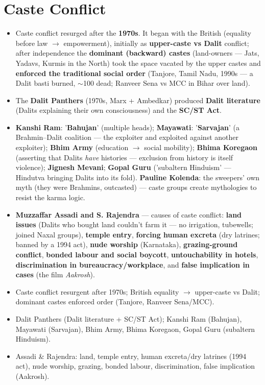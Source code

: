 \section{Caste Conflict}

\begin{KeyConcept}
\begin{itemize}
\item Caste conflict resurged after the \textbf{1970s}. It began with the British (equality before law $\rightarrow$ empowerment), initially as \textbf{upper-caste vs Dalit} conflict; after independence the \textbf{dominant (backward) castes} (land-owners --- Jats, Yadavs, Kurmis in the North) took the space vacated by the upper castes and \textbf{enforced the traditional social order} (Tanjore, Tamil Nadu, 1990s --- a Dalit basti burned, $\sim$100 dead; Ranveer Sena vs MCC in Bihar over land).
\item The \textbf{Dalit Panthers} (1970s, Marx + Ambedkar) produced \textbf{Dalit literature} (Dalits explaining their own consciousness) and the \textbf{SC/ST Act}.
\item \textbf{Kanshi Ram}: '\textbf{Bahujan}' (multiple heads); \textbf{Mayawati}: '\textbf{Sarvajan}' (a Brahmin--Dalit coalition --- the exploiter and exploited against another exploiter); \textbf{Bhim Army} (education $\rightarrow$ social mobility); \textbf{Bhima Koregaon} (asserting that Dalits \emph{have} histories --- exclusion from history is itself violence); \textbf{Jignesh Mevani}; \textbf{Gopal Guru} ('subaltern Hinduism' --- Hindutva bringing Dalits into its fold). \textbf{Pauline Kolenda}: the sweepers' own myth (they were Brahmins, outcasted) --- caste groups create mythologies to resist the karma logic.
\item \textbf{Muzzaffar Assadi and S. Rajendra} --- causes of caste conflict: \textbf{land issues} (Dalits who bought land couldn't farm it --- no irrigation, tubewells; joined Naxal groups), \textbf{temple entry}, \textbf{forcing human excreta} (dry latrines; banned by a 1994 act), \textbf{nude worship} (Karnataka), \textbf{grazing-ground conflict}, \textbf{bonded labour and social boycott}, \textbf{untouchability in hotels}, \textbf{discrimination in bureaucracy/workplace}, and \textbf{false implication in cases} (the film \emph{Aakrosh}).
\end{itemize}
\end{KeyConcept}

\begin{QuickRevision}
\begin{itemize}
\item Caste conflict resurgent after 1970s; British equality $\rightarrow$ upper-caste vs Dalit; dominant castes enforced order (Tanjore, Ranveer Sena/MCC).
\item Dalit Panthers (Dalit literature + SC/ST Act); Kanshi Ram (Bahujan), Mayawati (Sarvajan), Bhim Army, Bhima Koregaon, Gopal Guru (subaltern Hinduism).
\item Assadi \& Rajendra: land, temple entry, human excreta/dry latrines (1994 act), nude worship, grazing, bonded labour, discrimination, false implication (Aakrosh).
\end{itemize}
\end{QuickRevision}

